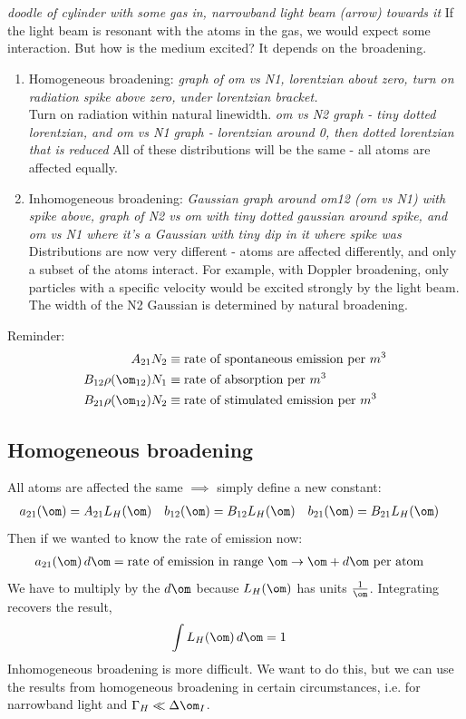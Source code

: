 \documentclass[a4paper, 11pt, normalem]{report}
\begin{document}
\chapter{}
\begin{example}
\textit{doodle of cylinder with some gas in, narrowband light beam (arrow) towards it}
If the light beam is resonant with the atoms in the gas, we would expect some interaction. 
But how is the medium excited?
It depends on the broadening. 
\begin{enumerate}
    \item Homogeneous broadening: \textit{graph of om vs N1, lorentzian about zero, turn on radiation spike above zero, under lorentzian bracket.}\\
        Turn on radiation within natural linewidth. 
        \textit{om vs N2 graph - tiny dotted lorentzian, and om vs N1 graph - lorentzian around 0, then dotted lorentzian that is reduced}
        All of these distributions will be the same - all atoms are affected equally.  
    \item Inhomogeneous broadening: \textit{Gaussian graph around om12 (om vs N1) with spike above, graph of N2 vs om with tiny dotted gaussian around spike, and om vs N1 where it's a Gaussian with tiny dip in it where spike was}
        Distributions are now very different - atoms are affected differently, and only a subset of the atoms interact.
        For example, with Doppler broadening, only particles with a specific velocity would be excited strongly by the light beam. 
        The width of the N2 Gaussian is determined by natural broadening. 
\end{enumerate}
\end{example}
Reminder:
\begin{align}
    A_{21}N_2 &\equiv \text{rate of spontaneous emission per }m^3 \\
    B_{12}\rho(\om_{12})N_1 &\equiv \text{rate of absorption per }m^3 \\
    B_{21}\rho(\om_{12})N_2 &\equiv \text{rate of stimulated emission per }m^3
\end{align}
\section{Homogeneous broadening}
All atoms are affected the same $\implies$ simply define a new constant:
\begin{align}
    a_{21}(\om) &= A_{21}L_H(\om) & b_{12}(\om) &= B_{12}L_H(\om) & b_{21}(\om) &= B_{21}L_H(\om)
\end{align}
Then if we wanted to know the rate of emission now:
\begin{align}
    a_{21}(\om)\,d\om &= \text{rate of emission in range $\om\to\om+d\om$ per atom} 
\end{align}
We have to multiply by the $d\om$ because $L_H(\om)$ has units $\frac{1}{\om}$.
Integrating recovers the result,
\begin{align}
    \int L_H(\om)\,d\om &= 1
\end{align}
Inhomogeneous broadening is more difficult. 
We want to do this, but we can use the results from homogeneous broadening in certain circumstances, i.e. for narrowband light and $\Gamma_H \ll \Delta\om_I$.
\end{document}
